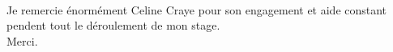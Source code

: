 \thispagestyle{empty}
\vspace*{\fill}
{\large{\\[0.2cm]}

	\begin{minipage}[c]{\textwidth}
	\center
       Je remercie énormément Celine Craye pour son engagement et aide constant pendent tout le déroulement de mon stage. \\ Merci.
      \end{minipage}
}
\vspace*{\fill}
\newpage

